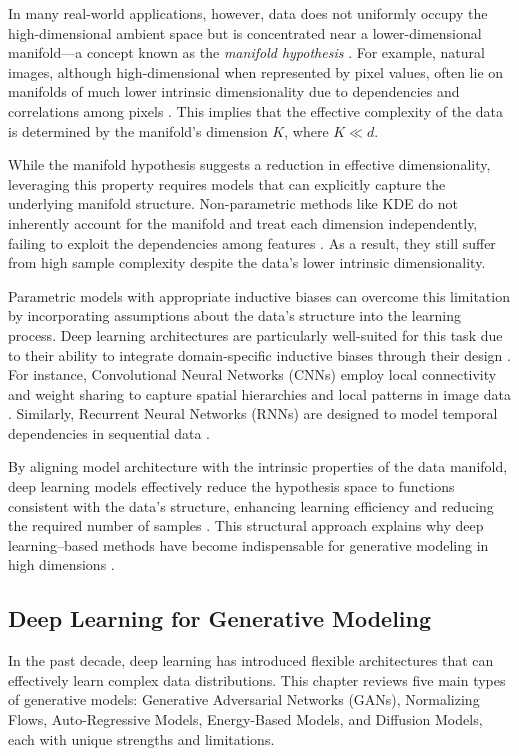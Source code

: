 In many real-world applications, however, data does not uniformly occupy the high-dimensional ambient space but is concentrated near a lower-dimensional manifold—a concept known as the \emph{manifold hypothesis} \cite{fefferman2016testing}. For example, natural images, although high-dimensional when represented by pixel values, often lie on manifolds of much lower intrinsic dimensionality due to dependencies and correlations among pixels \cite{roweis2000nonlinear}. This implies that the effective complexity of the data is determined by the manifold's dimension \( K \), where \( K \ll d \).

While the manifold hypothesis suggests a reduction in effective dimensionality, leveraging this property requires models that can explicitly capture the underlying manifold structure. Non-parametric methods like KDE do not inherently account for the manifold and treat each dimension independently, failing to exploit the dependencies among features \cite{tenenbaum2000global}. As a result, they still suffer from high sample complexity despite the data's lower intrinsic dimensionality.

Parametric models with appropriate inductive biases can overcome this limitation by incorporating assumptions about the data's structure into the learning process. Deep learning architectures are particularly well-suited for this task due to their ability to integrate domain-specific inductive biases through their design \cite{lecun2015deep}. For instance, Convolutional Neural Networks (CNNs) employ local connectivity and weight sharing to capture spatial hierarchies and local patterns in image data \cite{lecun1998gradient}. Similarly, Recurrent Neural Networks (RNNs) are designed to model temporal dependencies in sequential data \cite{hochreiter1997long}.

By aligning model architecture with the intrinsic properties of the data manifold, deep learning models effectively reduce the hypothesis space to functions consistent with the data's structure, enhancing learning efficiency and reducing the required number of samples \cite{poggio2017theory}. This structural approach explains why deep learning–based methods have become indispensable for generative modeling in high dimensions \cite{goodfellow2016deep,kingma2013auto}.
\subsection{Deep Learning for Generative Modeling}
In the past decade, deep learning has introduced flexible architectures that can effectively learn complex data distributions. This chapter reviews five main types of generative models: Generative Adversarial Networks (GANs), Normalizing Flows, Auto-Regressive Models, Energy-Based Models, and Diffusion Models, each with unique strengths and limitations.

